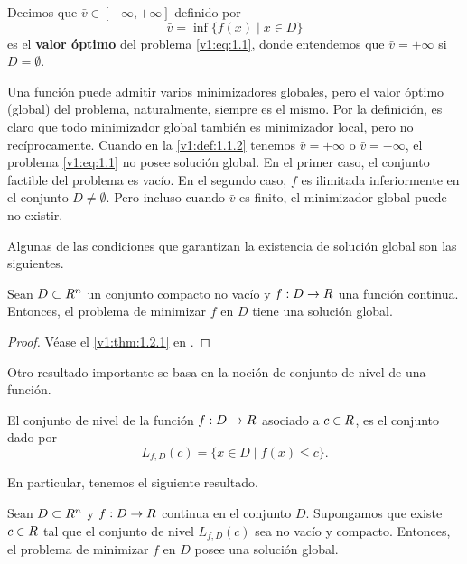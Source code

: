 \begin{definition}\label{v1:def:1.1.2}
    Decimos que $\bar{v} \in [-\infty, +\infty]$ definido por
    \[
        \bar{v} = \inf \{ f(x) \mid x \in D \}
    \]
    es el \textbf{valor óptimo} del problema \eqref{v1:eq:1.1}, donde entendemos que $\bar{v} = +\infty$ si $D = \emptyset$.
\end{definition}

Una función puede admitir varios minimizadores globales, pero el valor óptimo (global) del problema, naturalmente, siempre es el mismo. Por la definición, es claro que todo minimizador global también es minimizador local, pero no recíprocamente.
Cuando en la \cref{v1:def:1.1.2} tenemos $\bar{v} = +\infty$ o $\bar{v} = -\infty$, el problema \eqref{v1:eq:1.1} no posee solución global. En el primer caso, el conjunto factible del problema es vacío. En el segundo caso, $f$ es ilimitada inferiormente en el conjunto $D \neq \emptyset$. Pero incluso cuando $\bar{v}$ es finito, el minimizador global puede no existir.

Algunas de las condiciones que garantizan la existencia de solución global son las siguientes.

\begin{theorem}\label{v1:thm:1.1.1}
    Sean $D \subset R^n$ un conjunto compacto no vacío y $f : D \to R$ una función continua. Entonces, el problema de minimizar $f$ en $D$ tiene una solución global.
\end{theorem}

\begin{proof}
    Véase el \cref{v1:thm:1.2.1} en \cite{izmailov1020otimizacaovolume1}.
\end{proof}

Otro resultado importante se basa en la noción de conjunto de nivel de una función.

\begin{definition}\label{v1:def:1.1.3}
    El conjunto de nivel de la función $f : D \to R$ asociado a $c \in R$, es el conjunto dado por
    \[
        L_{f,D}(c) = \{ x \in D \mid f(x) \le c \}.
    \]
\end{definition}

En particular, tenemos el siguiente resultado.

\begin{corollary}\label{v1:cor:1.1.1}
    Sean $D \subset R^n$ y $f : D \to R$ continua en el conjunto $D$. Supongamos que existe $c \in R$ tal que el conjunto de nivel $L_{f,D}(c)$ sea no vacío y compacto.
    Entonces, el problema de minimizar $f$ en $D$ posee una solución global.
\end{corollary}

